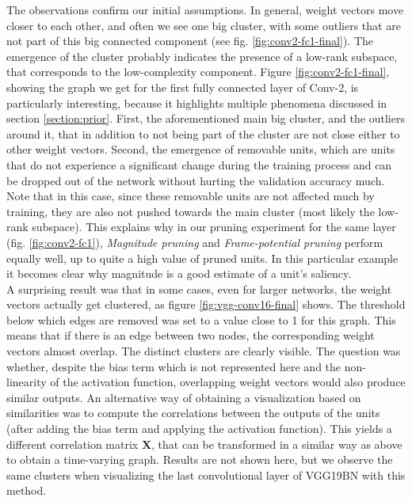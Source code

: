The observations confirm our initial assumptions. In general, weight vectors move closer to each other, and often we see one big cluster, with some outliers that are not part of this big connected component (see fig. \ref{fig:conv2-fc1-final}). The emergence of the cluster probably indicates the presence of a low-rank subspace, that corresponds to the low-complexity component. Figure \ref{fig:conv2-fc1-final}, showing the graph we get for the first fully connected layer of Conv-2, is particularly interesting, because it highlights multiple phenomena discussed in section \ref{section:prior}. First, the aforementioned main big cluster, and the outliers around it, that in addition to not being part of the cluster are not close either to other weight vectors. Second, the emergence of removable units, which are units that do not experience a significant change during the training process and can be dropped out of the network without hurting the validation accuracy much. Note that in this case, since these removable units are not affected much by training, they are also not pushed towards the main cluster (most likely the low-rank subspace). This explains why in our pruning experiment for the same layer (fig. \ref{fig:conv2-fc1}), \textit{Magnitude pruning} and \textit{Frame-potential pruning} perform equally well, up to quite a high value of pruned units. In this particular example it becomes clear why magnitude is a good estimate of a unit's saliency. \\

A surprising result was that in some cases, even for larger networks, the weight vectors actually get clustered, as figure \ref{fig:vgg-conv16-final} shows. The threshold below which edges are removed was set to a value close to 1 for this graph. This means that if there is an edge between two nodes, the corresponding weight vectors almost overlap. The distinct clusters are clearly visible. The question was whether, despite the bias term which is not represented here and the non-linearity of the activation function, overlapping weight vectors would also produce similar outputs. An alternative way of obtaining a visualization based on similarities was to compute the correlations between the outputs of the units (after adding the bias term and applying the activation function). This yields a different correlation matrix $\mathbf{X}$, that can be transformed in a similar way as above to obtain a time-varying graph. Results are not shown here, but we observe the same clusters when visualizing the last convolutional layer of VGG19BN with this method. \\

